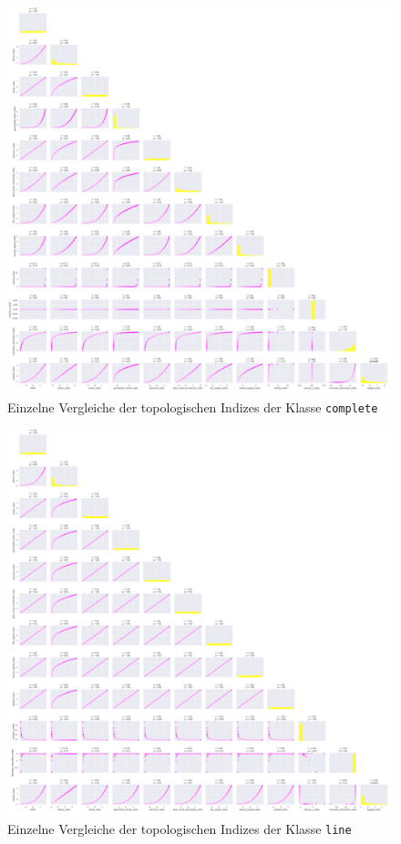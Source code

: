 \begin{figure}[H]
    \centering
    \includegraphics[width=1.2\textwidth]{images/30_results/complete-correlation-pairs.png}
    \caption{Einzelne Vergleiche der topologischen Indizes der Klasse \texttt{complete}}
    \label{fig:correlation-pairs-complete}
\end{figure}

\begin{figure}[H]
    \centering
    \includegraphics[width=1.2\textwidth]{images/30_results/line-correlation-pairs.png}
    \caption{Einzelne Vergleiche der topologischen Indizes der Klasse \texttt{line}}
    \label{fig:correlation-pairs-line}
\end{figure}


